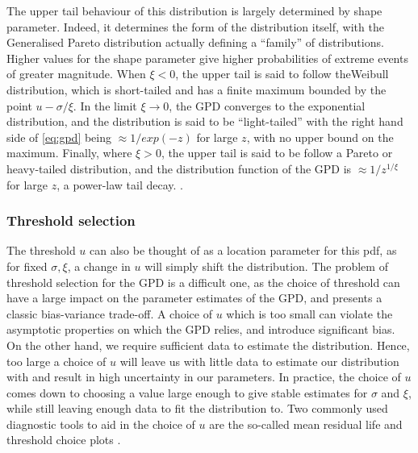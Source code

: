 \documentclass{article}
\numberwithin{equation}{section}
\begin{document}
The upper tail behaviour of this distribution is largely determined by shape parameter. 
Indeed, it determines the form of the distribution itself, with the Generalised Pareto distribution actually defining a ``family'' of distributions. 
Higher values for the shape parameter give higher probabilities of extreme events of greater magnitude. 
When $\xi < 0$, the upper tail is said to follow theWeibull distribution, which is short-tailed and has a finite maximum bounded by the point $u - \sigma/\xi$. 
In the limit $\xi \to 0$, the GPD converges to the exponential distribution, and the distribution is said to be ``light-tailed'' with the right hand side of \ref{eq:gpd} being $ \approx 1/exp(-z)$ for large $z$, with no upper bound on the maximum.
Finally, where $\xi > 0$, the upper tail is said to be follow a Pareto or heavy-tailed distribution, and the distribution function of the GPD is $\approx 1/z^{1/\xi}$ for large $z$, a power-law tail decay. \cite{Rohrbeck2021} \cite{Carreau2017}.

\subsubsection{Threshold selection} \label{subsubsec:threshold}
The threshold $u$ can also be thought of as a location parameter for this pdf, as for fixed $\sigma, \xi$, a change in $u$ will simply shift the distribution. \cite{Coles2001}
The problem of threshold selection for the GPD is a difficult one, as the choice of threshold can have a large impact on the parameter estimates of the GPD, and presents a classic bias-variance trade-off. 
A choice of $u$ which is too small can violate the asymptotic properties on which the GPD relies, and introduce significant bias. 
On the other hand, we require sufficient data to estimate the distribution. 
Hence, too large a choice of $u$ will leave us with little data to estimate our distribution with and result in high uncertainty in our parameters. 
In practice, the choice of $u$ comes down to choosing a value large enough to give stable estimates for $\sigma$ and $\xi$, while still leaving enough data to fit the distribution to. 
Two commonly used diagnostic tools to aid in the choice of $u$ are the so-called mean residual life and threshold choice plots \cite{Coles2001}.
\end{document}
